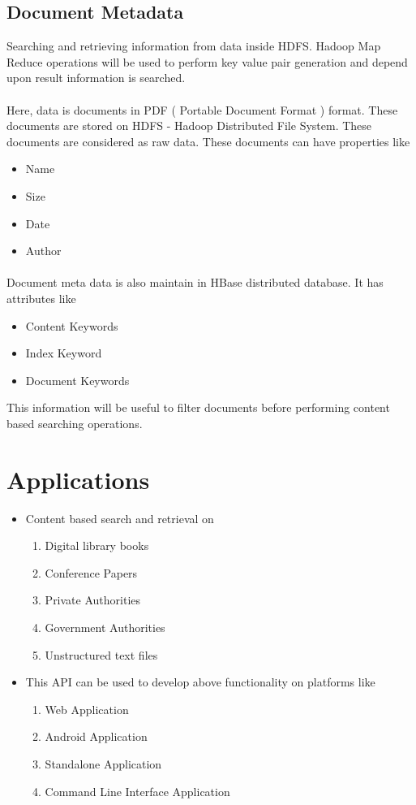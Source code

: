 \documentclass{IEEEtran}
\begin{document}
\subsection{Document Metadata}
Searching and retrieving information from data inside HDFS. Hadoop Map Reduce operations will be used to perform key value pair generation and depend upon result information is searched. 
\paragraph{}
Here, data is documents in PDF ( Portable Document Format ) format. These documents are stored on HDFS - Hadoop Distributed File System. These documents are considered as raw data. These documents can have properties like
\begin{itemize}
\item Name
\item Size
\item Date
\item Author
\end{itemize}
\paragraph{}
Document meta data is also maintain in HBase distributed database. It has attributes like
\begin{itemize}
\item Content Keywords
\item Index Keyword
\item Document Keywords
\end{itemize}
This information will be useful to filter documents before performing content based  searching operations.

\section{Applications}
\begin{itemize}
\item Content based search and retrieval on
\begin{enumerate}
\item Digital library books 
\item Conference Papers
\item Private Authorities
\item Government Authorities
\item Unstructured text files
\end{enumerate}

\item This API can be used to develop above functionality on platforms like
\begin{enumerate}
\item Web Application
\item Android Application
\item Standalone Application
\item Command Line Interface Application
\end{enumerate}

\end{itemize}
\end{document}
